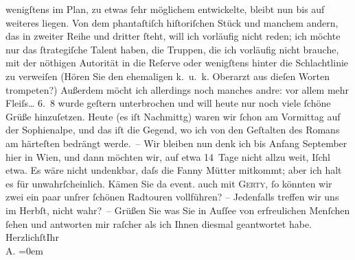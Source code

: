 \begin{ledgroupsized}[t]{13cm}
               wenigſtens im Plan, zu etwas ſehr möglichem entwickelte, {\pb}bleibt nun bis auf weiteres liegen. Von dem phantaſtiſch hiſtoriſchen Stück und manchem andern, das
               in zweiter Reihe und dritter ſteht, will ich vorläufig nicht reden; ich möchte nur
               das ſtrategiſche Talent haben, die Truppen, die ich vorläufig nicht brauche, mit der
               nöthigen Autorität in die Reſerve oder wenigſtens hinter die Schlachtlinie zu
               verweiſen (Hören Sie den ehemaligen k. u. k. Oberarzt aus dieſen Worten trompeten?)
               Außerdem {\pb}möcht ich allerdings noch manches andre: vor
               allem mehr Fleiſs{\dots}\pend
           \pstart
           \raggedleft{}6. 8\pend
           \pstart
           wurde geſtern unterbrochen und will heute nur noch viele ſchöne Grüße hinzuſetzen.
               Heute (es iſt Nachmittg) waren wir ſchon am Vormittag auf
               der Sophienalpe, und das iſt die Gegend, wo ich
               von den Geſtalten des Romans
               am härteſten bedrängt werde. –\pend
           \pstart
           Wir bleiben nun denk ich bis Anfang September hier in Wien, und dann möchten wir, auf etwa 14 Tage nicht allzu weit,
                  Iſchl etwa. Es {\pb}wäre nicht undenkbar, daſs die Fanny Mütter
               mitkommt; aber ich halt es für unwahrſcheinlich. Kämen Sie da{\geminationn} event. auch mit \textsc{Gerty}, ſo könnten wir zwei ein paar unſrer ſchönen Radtouren vollführen? – Jedenfalls
               treffen wir uns im Herbſt, nicht wahr? –\pend
           \pstart
           Grüßen Sie was Sie in Auſſee von erfreulichen
               Menſchen ſehen und antworten mir raſcher als ich Ihnen diesmal geantwortet habe.\pend
           \pstart
           Herzlichſt\hspace*{1.5em}Ihr{\\[\baselineskip]}\spacefill\mbox{A.}\pend
           \leftskip=0em{}
         
         \endnumbering{}\end{ledgroupsized}  \newcommand{\dateiname}{L01422}\newcommand{\titel}{Arthur Schnitzler an Hugo von Hofmannsthal, 5. – 6. 8. 1904}\newcommand{\editorInnen}{Martin Anton Müller und Gerd-Hermann Susen}
      